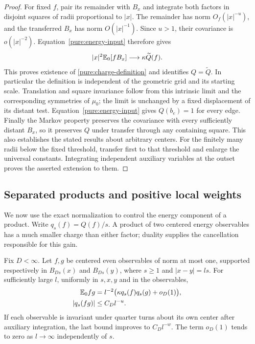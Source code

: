 \begin{proof}
For fixed $f$, pair its remainder with $B_x$ and integrate both factors
in disjoint squares of radii proportional to $|x|$.  The remainder has
norm $O_f(|x|^{-u})$, and the transferred $B_x$ has norm $O(|x|^{-1})$.
Since $u>1$, their covariance is $o(|x|^{-2})$.
Equation~\eqref{pure:energy-input} therefore gives
\[
 |x|^2\mathbb E_0[fB_x]\longrightarrow\kappa\widetilde Q(f).
\]
This proves existence of \eqref{pure:charge-definition} and identifies
$Q=\widetilde Q$.  In particular the definition is independent of the
geometric grid and its starting scale.  Translation and square invariance
follow from this intrinsic limit and the corresponding symmetries of
$\mu_0$; the limit is unchanged by a fixed displacement of its distant
test.  Equation~\eqref{pure:energy-input} gives $Q(b_e)=1$ for every edge.
Finally the Markov property preserves the covariance with every sufficiently
distant $B_x$, so it preserves $Q$ under transfer through any containing
square.  This also establishes the stated results about arbitrary centers.
For the finitely many radii below the fixed threshold, transfer first to
that threshold and enlarge the universal constants.  Integrating independent
auxiliary variables at the outset proves the asserted extension to them.
\end{proof}

\subsection{Separated products and positive local weights}

We now use the exact normalization to control the energy component of a
product.  Write $q_s(f)=Q(f)/s$.  A product of two centered energy
observables has a much smaller charge than either factor; duality supplies
the cancellation responsible for this gain.

\begin{proposition}
\label{pure:fusion}
Fix $D<\infty$.  Let $f,g$ be centered even observables of norm at most
one, supported respectively in $B_{Ds}(x)$ and $B_{Ds}(y)$, where
$s\geq1$ and $|x-y|=ls$.  For sufficiently large $l$, uniformly in $s,x,y$
and in the observables,
\begin{align}
 \mathbb E_0fg&=l^{-2}\bigl(\kappa q_s(f)q_s(g)+o_D(1)\bigr),
       \label{pure:fusion-covariance}\\
 |q_s(fg)|&\leq C_Dl^{-u}.
       \label{pure:fusion-charge}
\end{align}
If each observable is invariant under quarter turns about its own center
after auxiliary integration, the last bound improves to $C_Dl^{-w}$.
The term $o_D(1)$ tends to zero as $l\to\infty$ independently of $s$.
\end{proposition}

